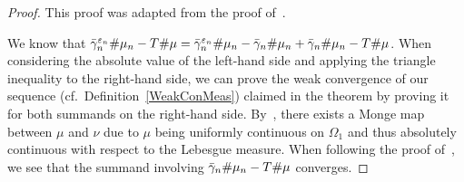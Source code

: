 \begin{proof}
	This proof was adapted from the proof of\ \cite[Theorem~2]{Seg2018}.

	We know that $\push[\bar{\gamma}_n^{\varepsilon_n}]{\mu_n} - \push{\mu} = \push[\bar{\gamma}_n^{\varepsilon_n}]{\mu_n} - \push[\bar{\gamma}_n]{\mu_n} + \push[\bar{\gamma}_n]{\mu_n} - \push{\mu}$. When considering the absolute value of the left-hand side and applying the triangle inequality to the right-hand side, we can prove the weak convergence of our sequence (cf.\ Definition~\ref{WeakConMeas}) claimed in the theorem by proving it for both summands on the right-hand side.	By\ \cite[Corollary~9.3]{Vill2009}, there exists a Monge map between $\mu$ and $\nu$ due to $\mu$ being uniformly continuous on $\Omega_1$ and thus absolutely continuous with respect to the Lebesgue measure. When following the proof of\ \cite[Theorem~2]{Seg2018}, we see that the summand involving $\push[\bar{\gamma}_n]{\mu_n} - \push[T]{\mu}$ converges.
	

\end{proof}
